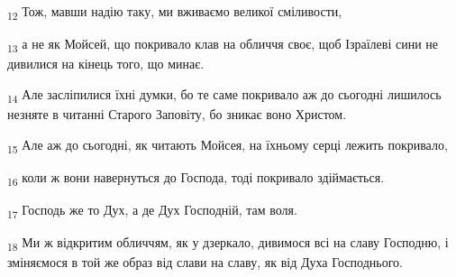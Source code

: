 \begin{tcolorbox}
\textsubscript{12} Тож, мавши надію таку, ми вживаємо великої сміливости,
\end{tcolorbox}
\begin{tcolorbox}
\textsubscript{13} а не як Мойсей, що покривало клав на обличчя своє, щоб Ізраїлеві сини не дивилися на кінець того, що минає.
\end{tcolorbox}
\begin{tcolorbox}
\textsubscript{14} Але засліпилися їхні думки, бо те саме покривало аж до сьогодні лишилось незняте в читанні Старого Заповіту, бо зникає воно Христом.
\end{tcolorbox}
\begin{tcolorbox}
\textsubscript{15} Але аж до сьогодні, як читають Мойсея, на їхньому серці лежить покривало,
\end{tcolorbox}
\begin{tcolorbox}
\textsubscript{16} коли ж вони навернуться до Господа, тоді покривало здіймається.
\end{tcolorbox}
\begin{tcolorbox}
\textsubscript{17} Господь же то Дух, а де Дух Господній, там воля.
\end{tcolorbox}
\begin{tcolorbox}
\textsubscript{18} Ми ж відкритим обличчям, як у дзеркало, дивимося всі на славу Господню, і зміняємося в той же образ від слави на славу, як від Духа Господнього.
\end{tcolorbox}
